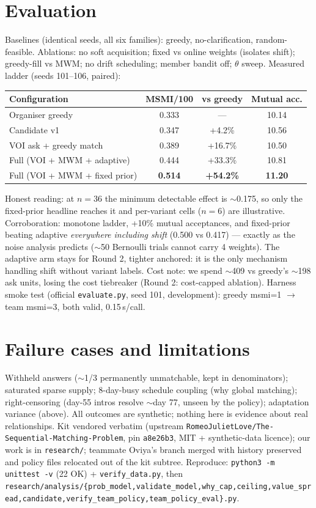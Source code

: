 \documentclass[11pt,a4paper]{article}
\begin{document}
\section{Evaluation}
Baselines (identical seeds, all six families): greedy, no-clarification,
random-feasible. Ablations: no soft acquisition; fixed vs online weights
(isolates shift); greedy-fill vs MWM; no drift scheduling; member bandit off;
$\theta$ sweep. Measured ladder (seeds 101--106, paired):

\begin{center}
\begin{tabular}{lccc}
\toprule
Configuration & MSMI/100 & vs greedy & Mutual acc. \\
\midrule
Organiser greedy & 0.333 & --- & 10.14 \\
Candidate v1 & 0.347 & +4.2\% & 10.56 \\
VOI ask + greedy match & 0.389 & +16.7\% & 10.50 \\
Full (VOI + MWM + adaptive) & 0.444 & +33.3\% & 10.81 \\
Full (VOI + MWM + fixed prior) & \textbf{0.514} & \textbf{+54.2\%} & \textbf{11.20} \\
\bottomrule
\end{tabular}
\end{center}

Honest reading: at $n=36$ the minimum detectable effect is $\sim$0.175, so
only the fixed-prior headline reaches it and per-variant cells ($n=6$) are
illustrative. Corroboration: monotone ladder, +10\% mutual acceptances, and
fixed-prior beating adaptive \emph{everywhere including shift} (0.500 vs
0.417) --- exactly as the noise analysis predicts ($\sim$50 Bernoulli trials
cannot carry 4 weights). The adaptive arm stays for Round 2, tighter anchored:
it is the only mechanism handling shift without variant labels. Cost note: we
spend $\sim$409 vs greedy's $\sim$198 ask units, losing the cost tiebreaker
(Round 2: cost-capped ablation). Harness smoke test (official
\texttt{evaluate.py}, seed 101, development): greedy msmi=1 $\to$ team msmi=3,
both valid, 0.15\,s/call.

\section{Failure cases and limitations}
Withheld answers ($\sim$1/3 permanently unmatchable, kept in denominators);
saturated sparse supply; 8-day-busy schedule coupling (why global matching);
right-censoring (day-55 intros resolve $\sim$day 77, unseen by the policy);
adaptation variance (above). All outcomes are synthetic; nothing here is
evidence about real relationships. Kit vendored verbatim (upstream
\texttt{RomeoJulietLove/The-Sequential-Matching-Problem}, pin
\texttt{a8e26b3}, MIT + synthetic-data licence); our work is in
\texttt{research/}; teammate Oviya's branch merged with history preserved and
policy files relocated out of the kit subtree. Reproduce:
\texttt{python3 -m unittest -v} (22 OK) + \texttt{verify\_data.py}, then
\texttt{research/analysis/\{prob\_model,validate\_model,why\_cap,ceiling,value\_spread,candidate,verify\_team\_policy,team\_policy\_eval\}.py}.
\end{document}
